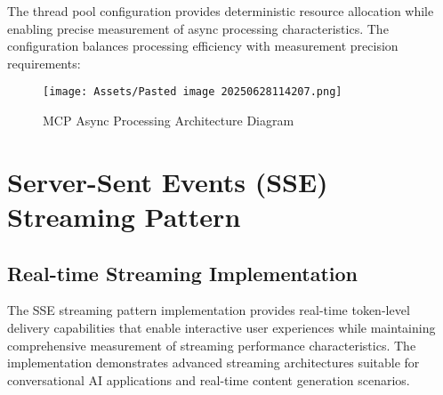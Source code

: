 

The thread pool configuration provides deterministic resource allocation while enabling precise measurement of async processing characteristics. The configuration balances processing efficiency with measurement precision requirements:


\begin{figure}[H]
    \centering
    \texttt{[image: Assets/Pasted image 20250628114207.png]}
    \caption{MCP Async Processing Architecture Diagram}
\end{figure}

\section{Server-Sent Events (SSE) Streaming Pattern}

\subsection{Real-time Streaming Implementation}

The SSE streaming pattern implementation provides real-time token-level delivery capabilities that enable interactive user experiences while maintaining comprehensive measurement of streaming performance characteristics. The implementation demonstrates advanced streaming architectures suitable for conversational AI applications and real-time content generation scenarios.


